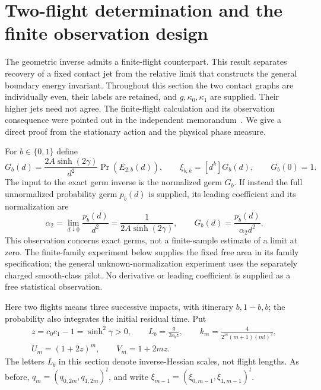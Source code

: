 \section{Two-flight determination and the finite observation design}
\label{sec:v13-two-flight}
The geometric inverse admits a finite-flight counterpart. This result
separates recovery of a fixed contact jet from the relative limit that
constructs the general boundary energy invariant. Throughout this section
the two contact graphs are individually even, their labels are retained,
and $g,\kappa_0,\kappa_1$ are supplied. Their higher jets need not agree.
The finite-flight calculation and its observation consequence were
pointed out in the independent memorandum~\cite{A2ReviewV12}. We give a
direct proof from the stationary action and the physical phase measure.

For $b\in\{0,1\}$ define
\begin{equation}\label{eq:v13-finite-law}
 G_b(d)=\frac{2A\sinh(2\gamma)}{d^2}\Pr(E_{2,b}(d)),\qquad
 \xi_{b,k}=[d^k]G_b(d),\qquad G_b(0)=1.
\end{equation}
The input to the exact germ inverse is the normalized germ $G_b$.
If instead the full unnormalized probability germ $p_b(d)$ is supplied,
its leading coefficient and its normalization are
\[
 \alpha_2=\lim_{d\downarrow0}\frac{p_b(d)}{d^2}
          =\frac{1}{2A\sinh(2\gamma)},\qquad
 G_b(d)=\frac{p_b(d)}{\alpha_2d^2}.
\]
This observation concerns exact germs, not a finite-sample estimate of a
limit at zero. The finite-family experiment below supplies the fixed
free area in its family specification; the general unknown-normalization
experiment uses the separately charged smooth-class pilot. No derivative
or leading coefficient is supplied as a free statistical observation.

Here two flights means three successive impacts, with itinerary
$b,1-b,b$; the probability also integrates the initial residual time.
Put
\begin{equation}\label{eq:v13-constants}
 \begin{gathered}
 z=c_0c_1-1=\sinh^2\gamma>0,\qquad
 L_b=\frac{g}{2c_bz},\qquad
 k_m=\frac{4}{2^m(m+1)(m!)^2},\\
 U_m=(1+2z)^m,\qquad V_m=1+2mz.
 \end{gathered}
\end{equation}
The letters $L_b$ in this section denote inverse-Hessian scales, not
flight lengths. As before, $q_m=(q_{0,2m},q_{1,2m})^t$, and write
$\xi_{m-1}=(\xi_{0,m-1},\xi_{1,m-1})^t$.

